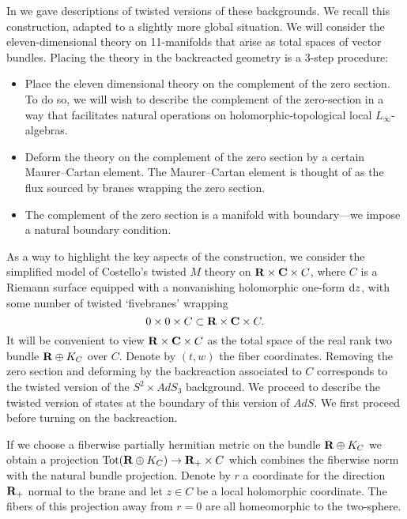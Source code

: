 \documentclass[11pt]{amsart}%
\begin{document}
In \cite{RSW} we gave descriptions of twisted versions of these backgrounds. We recall this construction, adapted to a slightly more global situation. We will consider the eleven-dimensional theory on 11-manifolds that arise as total spaces of vector bundles. Placing the theory in the backreacted geometry is a 3-step procedure:

\begin{itemize}
  \item Place the eleven dimensional theory on the complement of the zero section. To do so, we will wish to describe the complement of the zero-section in a way that facilitates natural operations on holomorphic-topological local $L_{\infty}$-algebras.

  \item Deform the theory on the complement of the zero section by a certain Maurer--Cartan element. 
  The Maurer--Cartan element is thought of as the flux sourced by branes wrapping the zero section.

  \item The complement of the zero section is a manifold with boundary---we impose a natural boundary condition.

\end{itemize}

\parsec[s:brkevin]

As a way to highlight the key aspects of the construction, we consider the simplified model of Costello's twisted $M$ theory on $\mathbf{R} \times \mathbf{C} \times C$, where $C$ is a Riemann surface equipped with a nonvanishing holomorphic one-form ${\rm d} z$, with some number of twisted `fivebranes' wrapping 
\[
0 \times 0 \times C \subset \mathbf{R} \times \mathbf{C} \times C .
\]
It will be convenient to view $\mathbf{R} \times \mathbf{C} \times C$ as the total space of the real rank two bundle $\mathbf{R} \oplus K_C$ over $C$. 
Denote by $(t,w)$ the fiber coordinates.
Removing the zero section and deforming by the backreaction associated to $C$ corresponds to the twisted version of the $S^2 \times AdS_3$ background. 
We proceed to describe the twisted version of states at the boundary of this version of $AdS$. 
We first proceed before turning on the backreaction.

If we choose a fiberwise partially hermitian metric on the bundle $\mathbf{R} \oplus K_C$ we obtain a projection ${\rm Tot}(\mathbf{R} \oplus K_C) \to \mathbf{R}_+ \times C$ which combines the fiberwise norm with the natural bundle projection.
Denote by $r$ a coordinate for the direction $\mathbf{R}_+$ normal to the brane and let $z \in C$ be a local holomorphic coordinate. 
The fibers of this projection away from $r = 0$ are all homeomorphic to the two-sphere.
\end{document}
